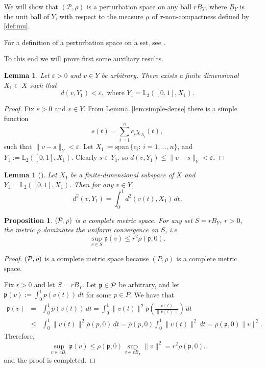 \documentclass[12pt,leqno]{article}
\newtheorem{lem}[thm]{Lemma}          %
\newtheorem{prop}[thm]{Proposition}   %
\theoremstyle{definition}
\theoremstyle{remark}
\def\ds{\displaystyle}
\def\L{\mathbb{L}}
\begin{document}
    We will show that $(\mathcal{P},\rho)$ is a perturbation space on any ball $rB_Y$, where $B_Y$ is the unit ball of $Y$, with respect to the measure $\mu$ of $\tau$-non-compactness defined by \eqref{def:mu}.

For a definition of a perturbation space on a set, see \cite[Definition 2]{Orlitz}.

    To this end we will prove first some auxiliary results.

    \begin{lem}
        \label{lem:42}
        Let $\varepsilon > 0$ and $v\in Y$ be arbitrary. There exists a finite dimensional $X_1\subset X$ such that
        $$
            d(v,Y_1) < \varepsilon,\text{ where }Y_1 = \L_2([0,1],X_1).
        $$
    \end{lem}
    \begin{proof}
        Fix $\varepsilon > 0$ and $v\in Y$. From Lemma~\ref{lem:simple-dense} there is a simple function
        $$
            s(t) = \sum_{i=1}^n c_i \chi_{A_i}(t),
        $$
        such that $\|v-s\|_Y < \varepsilon$. Let
        $
            X_1 := \mathrm{span}\,\{c_i:\ i=1,\ldots,n\}$,
            and $Y_1 := \L_2([0,1],X_1)$. Clearly $s\in Y_1$, so $d(v,Y_1) \le \|v-s\|_Y< \varepsilon$.
    \end{proof}
    \begin{lem}[{\cite[Lemma~2.5]{iv_var_integr}}]
        \label{lem:43}
        Let $X_1$ be a finite-dimensional subspace of $X$ and $Y_1 = \L_2([0,1],X_1)$. Then for any $v\in Y$,
        $$
            d^2(v,Y_1) = \int_0^1 d^2(v(t),X_1)\, dt.
        $$
    \end{lem}

 \begin{prop} \label{prop:dominate-uniform}
 $({\cal{P}},\rho)$ is a complete metric space. For any set $S=rB_Y$, $r>0$, the metric $\rho$ dominates the uniform convergence on $S$, i.e.
 \[
 \sup_{v\in S}\mathfrak{p}(v)\le r^2\rho(\mathfrak{p},0).
 \]
 \end{prop}

 \begin{proof}
  $({\cal{P}},\rho)$ is a complete metric space because  $(P,\bar\rho)$ is a complete metric space.

  Fix $r>0$ and let $S=rB_Y$. Let $\mathfrak{p}\in {\cal{P}}$ be arbitrary, and let $\ds \mathfrak{p}(v) := \int_0^1 p(v(t))\, dt$ for some $p\in P$. We have that
 \begin{eqnarray*}
  \mathfrak{p}(v)&=&  \int_0^1 p(v(t))\, dt =   \int_0^1 \|v(t)\|^2 p\left(\frac{v(t)}{\|v(t)\|}\right)\, dt\\
  &\le& \int_0^1 \|v(t)\|^2 \bar\rho(p,0)\, dt = \bar\rho(p,0)\int_0^1 \|v(t)\|^2 \, dt =\rho(\mathfrak{p},0)\|v\|^2.
 \end{eqnarray*}
Therefore,
\[
 \sup_{v\in rB_Y}\mathfrak{p}(v)\le \rho(\mathfrak{p},0)\sup_{v\in rB_Y} \|v\|^2 =r^2\rho(\mathfrak{p},0).
 \]
 and the proof is completed.
 \end{proof}
\end{document}
